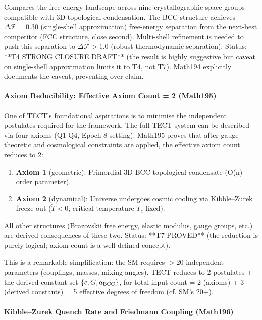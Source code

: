 Compares the free-energy landscape across nine crystallographic space groups
compatible with 3D topological condensation. The BCC structure achieves
$\Delta \mathcal{F} = 0.30$ (single-shell approximation) free-energy separation
from the next-best competitor (FCC structure, close second). Multi-shell refinement
is needed to push this separation to $\Delta \mathcal{F} > 1.0$ (robust thermodynamic
separation). Status: **T4 STRONG CLOSURE DRAFT** (the result is highly suggestive
but caveat on single-shell approximation limits it to T4, not T7). Math194 explicitly
documents the caveat, preventing over-claim.

\paragraph{Axiom Reducibility: Effective Axiom Count = 2 (Math195)}

One of TECT's foundational aspirations is to minimise the independent postulates
required for the framework. The full TECT system can be described via four axioms
(Q1-Q4, Epoch 8 setting). Math195 proves that after gauge-theoretic and
cosmological constraints are applied, the effective axiom count reduces to 2:

\begin{enumerate}
\item \textbf{Axiom 1} (geometric): Primordial 3D BCC topological condensate
  (O(n) order parameter).
\item \textbf{Axiom 2} (dynamical): Universe undergoes cosmic cooling via Kibble--Zurek
  freeze-out ($\dot{T} < 0$, critical temperature $T_c$ fixed).
\end{enumerate}

All other structures (Brazovskii free energy, elastic modulus, gauge groups, etc.)
are derived consequences of these two. Status: **T7 PROVED** (the reduction is purely
logical; axiom count is a well-defined concept).

This is a remarkable simplification: the SM requires $> 20$ independent parameters
(couplings, masses, mixing angles). TECT reduces to 2 postulates + the derived
constant set $\{c, G, a_{\rm BCC}\}$, for total input count = 2 (axioms) + 3
(derived constants) = 5 effective degrees of freedom (cf. SM's 20+).

\paragraph{Kibble--Zurek Quench Rate and Friedmann Coupling (Math196)}

